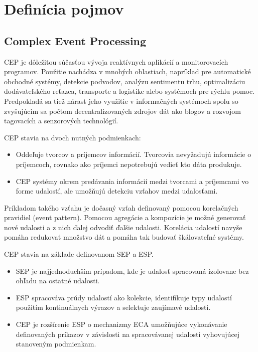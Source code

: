 \chapter{Definícia pojmov}
\label{chap:pojmy}

	\section{Complex Event Processing}
	\ac{CEP} je dôležitou súčasťou vývoja reaktívnych aplikácií a monitorovacích programov. Použitie nachádza v mnohých oblastiach, napríklad pre automatické obchodné systémy, detekcie podvodov, analýzu sentimentu trhu, optimalizáciu dodávateľského reťazca, transporte a logistike alebo systémoch pre rýchlu pomoc. Predpokladá sa tiež nárast jeho využitie v informačných systémoch spolu so zvyšujúcim sa počtom decentralizovaných zdrojov dát ako blogov a rozvojom tagovacích a senzorových technológií.
	
	\ac{CEP} stavia na dvoch nutných podmienkach:
	\begin{itemize}
		\item Oddeľuje tvorcov a príjemcov informácií. Tvorcovia nevyžadujú informácie o príjemcoch, rovnako ako príjemci nepotrebujú vedieť kto dáta produkuje.
		\item CEP systémy okrem predávania informácií medzi tvorcami a príjemcami vo forme udalostí, ale umožňujú detekciu vzťahov medzi udalosťami.
	\end{itemize}
	
	Príkladom takého vzťahu je dočasný vzťah definovaný pomocou korelačných pravidiel (event pattern). Pomocou agregácie a kompozície je možné generovať nové udalosti a z nich ďalej odvodiť ďalšie udalosti. Korelácia udalostí navyše pomáha redukovať množstvo dát a pomáha tak budovať škálovateľné systémy.
	
	\ac{CEP} stavia na základe definovanom \ac{SEP} a \ac{ESP}.
	\begin{itemize}
		\item SEP je najjednoduchším prípadom, kde je udalosť spracovaná izolovane bez ohľadu na ostatné udalosti.
		\item ESP spracováva prúdy udalostí ako kolekcie, identifikuje typy udalostí použitím kontinuálnych výrazov a selektuje zaujímavé udalosti.
		\item CEP je rozšírenie ESP o mechanizmy \ac{ECA} umožňujúce vykonávanie definovaných príkazov v závislosti na spracovávanej udalosti vyhovujúcej stanoveným podmienkam.
	\end{itemize}
	
